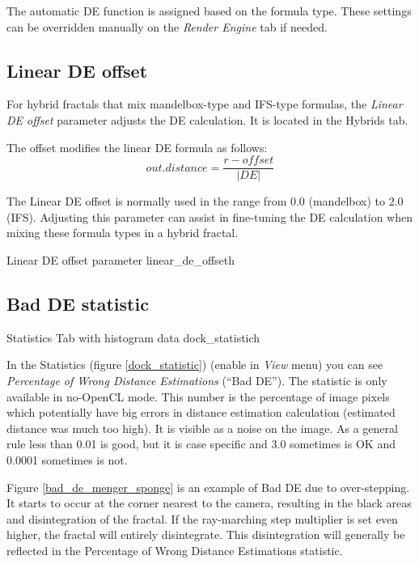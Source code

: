 The automatic DE function is assigned based on the formula type. These settings can be overridden manually on the \emph{Render Engine} tab if needed.

\subsection{Linear DE offset}\label{linear-de-offset}

For hybrid fractals that mix mandelbox-type and IFS-type formulas, the \emph{Linear DE offset} parameter adjusts the DE calculation. It is located in the Hybrids tab.

The offset modifies the linear DE formula as follows:
\[ out.distance = \frac{r - offset}{\lvert DE \rvert} \]

The Linear DE offset is normally used in the range from 0.0 (mandelbox) to 2.0 (IFS). Adjusting this parameter can assist in fine-tuning the DE calculation when mixing these formula types in a hybrid fractal.

{Linear DE offset parameter}
{linear_de_offset}{h}

\subsection{Bad DE statistic}\label{bad-de-statistic}

{Statistics Tab with histogram data}
{dock_statistic}{h}

In the Statistics (figure \ref{dock_statistic}) (enable in \emph{View} menu) you can see \emph{Percentage of
	Wrong Distance Estimations} (``Bad DE''). The statistic is only available in no-OpenCL mode. This number is the percentage of image
pixels which potentially have big errors in distance estimation calculation
(estimated distance was much too high). It is visible as a noise on the image.
As a general rule less than 0.01 is good, but it is case specific and 3.0
sometimes is OK and 0.0001 sometimes is not.

Figure \ref{bad_de_menger_sponge} is an example of Bad DE due to over-stepping. It starts to occur at the corner nearest to the camera, resulting in the black areas and disintegration of the fractal. If the ray-marching step multiplier is set even higher, the fractal will entirely disintegrate. This disintegration will generally be reflected in the Percentage of Wrong Distance Estimations statistic.


